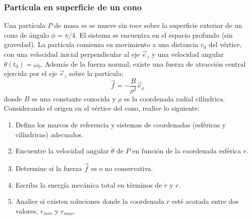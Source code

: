 \subsubsection{Partícula en superficie de un cono}

Una partícula $P$ de masa $m$ se mueve sin roce sobre la superficie exterior de un cono de ángulo $\phi = \pi/4$. El sistema se encuentra en el espacio profundo (sin gravedad). La partícula comienza su movimiento a una distancia $r_0$ del vértice, con una velocidad inicial perpendicular al eje $\vec{e}_z$ y una velocidad angular $\dot{\theta}(t_0) = \omega_0$. Además de la fuerza normal, existe una fuerza de atracción central ejercida por el eje $\vec{e}_z$ sobre la partícula:
\[ \vec{f} = -\frac{B}{\rho^2} \vec{e}_\rho \]
donde $B$ es una constante conocida y $\rho$ es la coordenada radial cilíndrica. Considerando el origen en el vértice del cono, realice lo siguiente:

\begin{enumerate}
    \item Defina los marcos de referencia y sistemas de coordenadas (esféricas y cilíndricas) adecuados.
    \item Encuentre la velocidad angular $\dot{\theta}$ de $P$ en función de la coordenada esférica $r$.
    \item Determine si la fuerza $\vec{f}$ es o no conservativa.
    \item Escriba la energía mecánica total en términos de $\dot{r}$ y $r$.
    \item Analice si existen soluciones donde la coordenada $r$ esté acotada entre dos valores, $r_{min}$ y $r_{max}$.
\end{enumerate}

